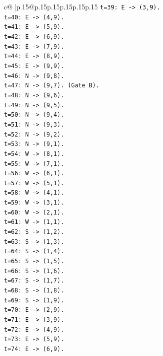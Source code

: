\documentclass{article}
\begin{document}
{\begin{supertabular}{c@{$\;$}|p{.15\linewidth}@{}p{.15\linewidth}p{.15\linewidth}p{.15\linewidth}p{.15\linewidth}p{.15\linewidth}}
{{{\texttt{t=39: E {-}> (3,9).} \\
\texttt{t=40: E {-}> (4,9).} \\
\texttt{t=41: E {-}> (5,9).} \\
\texttt{t=42: E {-}> (6,9).} \\
\texttt{t=43: E {-}> (7,9).} \\
\texttt{t=44: E {-}> (8,9).} \\
\texttt{t=45: E {-}> (9,9).} \\
\texttt{t=46: N {-}> (9,8).} \\
\texttt{t=47: N {-}> (9,7). (Gate B).} \\
\texttt{t=48: N {-}> (9,6).} \\
\texttt{t=49: N {-}> (9,5).} \\
\texttt{t=50: N {-}> (9,4).} \\
\texttt{t=51: N {-}> (9,3).} \\
\texttt{t=52: N {-}> (9,2).} \\
\texttt{t=53: N {-}> (9,1).} \\
\texttt{t=54: W {-}> (8,1).} \\
\texttt{t=55: W {-}> (7,1).} \\
\texttt{t=56: W {-}> (6,1).} \\
\texttt{t=57: W {-}> (5,1).} \\
\texttt{t=58: W {-}> (4,1).} \\
\texttt{t=59: W {-}> (3,1).} \\
\texttt{t=60: W {-}> (2,1).} \\
\texttt{t=61: W {-}> (1,1).} \\
\texttt{t=62: S {-}> (1,2).} \\
\texttt{t=63: S {-}> (1,3).} \\
\texttt{t=64: S {-}> (1,4).} \\
\texttt{t=65: S {-}> (1,5).} \\
\texttt{t=66: S {-}> (1,6).} \\
\texttt{t=67: S {-}> (1,7).} \\
\texttt{t=68: S {-}> (1,8).} \\
\texttt{t=69: S {-}> (1,9).} \\
\texttt{t=70: E {-}> (2,9).} \\
\texttt{t=71: E {-}> (3,9).} \\
\texttt{t=72: E {-}> (4,9).} \\
\texttt{t=73: E {-}> (5,9).} \\
\texttt{t=74: E {-}> (6,9).} \\
}}}
\end{supertabular}}
\end{document}
